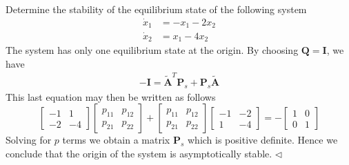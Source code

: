 \documentclass[12pt,a4paper,oneside]{book}
\begin{document}
\begin{onehalfspace}
\begin{thm}
\end{thm}
\begin{example}
	Determine the stability of the equilibrium state of the following system
	\begin{equation*}
		\begin{aligned}
			\dot{x}_1 &= -x_1 - 2x_2 \\[6pt]
			\dot{x}_2 &= x_1 - 4x_2
		\end{aligned}
	\end{equation*}
	The system has only one equilibrium state at the origin. By choosing 
	$\mathbf{Q} = \mathbf{I}$, we have
	\begin{equation*}
		\begin{aligned}
			-\mathbf{I} = \tilde{\mathbf{A}}^{T} 
			\mathbf{P}_s+\mathbf{P}_s\tilde{\mathbf{A}}
		\end{aligned}
	\end{equation*}
	This last equation may then be written as follows
	\begin{equation*}
		\begin{bmatrix}
			-1 & 1 \\[6pt]
			-2 & -4 
		\end{bmatrix}
		\begin{bmatrix}
			p_{11} & p_{12} \\[6pt]
			p_{21} & p_{22} 
		\end{bmatrix} +
		\begin{bmatrix}
			p_{11} & p_{12} \\[6pt]
			p_{21} & p_{22} 
		\end{bmatrix}
		\begin{bmatrix}
			-1 & -2 \\[6pt]
			1 & -4 
		\end{bmatrix} = -
		\begin{bmatrix}
			1 & 0 \\[6pt]
			0 & 1 
		\end{bmatrix}
	\end{equation*}
	Solving for $p$ terms we obtain a matrix $\mathbf{P}_s$ which is positive 
	definite. Hence we conclude that the origin of the system is asymptotically 
	stable.
	$\triangleleft$
\end{example}


\end{onehalfspace}
\end{document}
